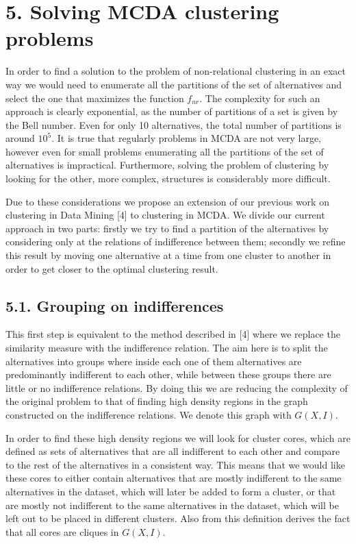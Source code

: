 \documentclass[10pt]{article}
\begin{document}
\section*{5. Solving MCDA clustering problems}
In order to find a solution to the problem of non-relational clustering in an exact way we would need to enumerate all the partitions of the set of alternatives and select the one that maximizes the function $f_{n r}$. The complexity for such an approach is clearly exponential, as the number of partitions of a set is given by the Bell number. Even for only 10 alternatives, the total number of partitions is around $10^{5}$. It is true that regularly problems in MCDA are not very large, however even for small problems enumerating all the partitions of the set of alternatives is impractical. Furthermore, solving the problem of clustering by looking for the other, more complex, structures is considerably more difficult.

Due to these considerations we propose an extension of our previous work on clustering in Data Mining [4] to clustering in MCDA. We divide our current approach in two parts: firstly we try to find a partition of the alternatives by considering only at the relations of indifference between them; secondly we refine this result by moving one alternative at a time from one cluster to another in order to get closer to the optimal clustering result.

\subsection*{5.1. Grouping on indifferences}
This first step is equivalent to the method described in [4] where we replace the similarity measure with the indifference relation. The aim here is to split the alternatives into groups where inside each one of them alternatives are predominantly indifferent to each other, while between these groups there are little or no indifference relations. By doing this we are reducing the complexity of the original problem to that of finding high density regions in the graph constructed on the indifference relations. We denote this graph with $G(X, I)$.

In order to find these high density regions we will look for cluster cores, which are defined as sets of alternatives that are all indifferent to each other and compare to the rest of the alternatives in a consistent way. This means that we would like these cores to either contain alternatives that are mostly indifferent to the same alternatives in the dataset, which will later be added to form a cluster, or that are mostly not indifferent to the same alternatives in the dataset, which will be left out to be placed in different clusters. Also from this definition derives the fact that all cores are cliques in $G(X, I)$.
\end{document}
